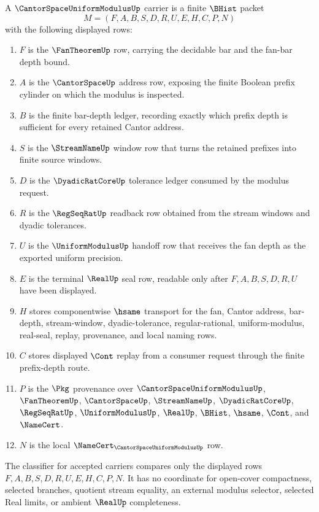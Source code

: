 \begin{definition}
\label{def:cantor-space-uniform-modulus-carrier}
A $\CantorSpaceUniformModulusUp$ carrier is a finite $\BHist$ packet
$$
M=(F,A,B,S,D,R,U,E,H,C,P,N)
$$
with the following displayed rows:
\begin{enumerate}
\item $F$ is the $\FanTheoremUp$ row, carrying the decidable bar and the fan-bar depth bound.
\item $A$ is the $\CantorSpaceUp$ address row, exposing the finite Boolean prefix cylinder on which the modulus is inspected.
\item $B$ is the finite bar-depth ledger, recording exactly which prefix depth is sufficient for every retained Cantor address.
\item $S$ is the $\StreamNameUp$ window row that turns the retained prefixes into finite source windows.
\item $D$ is the $\DyadicRatCoreUp$ tolerance ledger consumed by the modulus request.
\item $R$ is the $\RegSeqRatUp$ readback row obtained from the stream windows and dyadic tolerances.
\item $U$ is the $\UniformModulusUp$ handoff row that receives the fan depth as the exported uniform precision.
\item $E$ is the terminal $\RealUp$ seal row, readable only after $F,A,B,S,D,R,U$ have been displayed.
\item $H$ stores componentwise $\hsame$ transport for the fan, Cantor address, bar-depth, stream-window, dyadic-tolerance, regular-rational, uniform-modulus, real-seal, replay, provenance, and local naming rows.
\item $C$ stores displayed $\Cont$ replay from a consumer request through the finite prefix-depth route.
\item $P$ is the $\Pkg$ provenance over $\CantorSpaceUniformModulusUp$, $\FanTheoremUp$, $\CantorSpaceUp$, $\StreamNameUp$, $\DyadicRatCoreUp$, $\RegSeqRatUp$, $\UniformModulusUp$, $\RealUp$, $\BHist$, $\hsame$, $\Cont$, and $\NameCert$.
\item $N$ is the local $\NameCert_{\CantorSpaceUniformModulusUp}$ row.
\end{enumerate}
The classifier for accepted carriers compares only the displayed rows $F,A,B,S,D,R,U,E,H,C,P,N$. It has no coordinate for open-cover compactness, selected branches, quotient stream equality, an external modulus selector, selected Real limits, or ambient $\RealUp$ completeness.
\end{definition}

